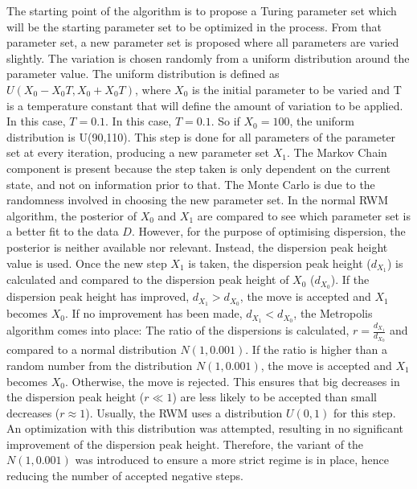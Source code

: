 The starting point of the algorithm is to propose a Turing parameter set which will be the starting parameter set to be optimized in the process.
From that parameter set, a new parameter set is proposed where all parameters are varied slightly.
The variation is chosen randomly from a uniform distribution around the parameter value.
The uniform distribution is defined as $U(X_{0} - X_{0}T, X_{0} + X_{0}T)$, where $X_{0}$ is the initial parameter to be varied and T is a temperature constant that will define the amount of variation to be applied.
In this case, $T=0.1$.
In this case, $T=0.1$.
So if $X_{0}=100$, the uniform distribution is U(90,110).
This step is done for all parameters of the parameter set at every iteration, producing a new parameter set $X_{1}$.
The Markov Chain component is present because the step taken is only dependent on the current state, and not on information prior to that.
The Monte Carlo is due to the randomness involved in choosing the new parameter set.
In the normal RWM algorithm, the posterior of $X_{0}$ and $X_{1}$ are compared to see which parameter set is a better fit to the data $D$.
However, for the purpose of optimising dispersion, the posterior is neither available nor relevant.
Instead, the dispersion peak height value is used.
Once the new step $X_{1}$ is taken, the dispersion peak height ($d_{X_{1}}$) is calculated and compared to the dispersion peak height of $X_{0}$ ($d_{X_{0}}$). If the dispersion peak height has improved, $d_{X_{1}} > d_{X_{0}}$, the move is accepted and $X_{1}$ becomes $X_{0}$.
If no improvement has been made, $d_{X_{1}} < d_{X_{0}}$, the Metropolis algorithm comes into place: The ratio of the dispersions is calculated, $r = \frac{d_{X_{1}}}{d_{X_{0}}}$ and compared to a normal distribution $N(1,0.001)$.
If the ratio is higher than a random number from the distribution $N(1,0.001)$, the move is accepted and $X_{1}$ becomes $X_{0}$.
Otherwise, the move is rejected.
This ensures that big decreases in the dispersion peak height ($r \ll 1$) are less likely to be accepted than small decreases ($r \approx 1$).
Usually, the RWM uses a distribution $U(0,1)$ for this step.
An optimization with this distribution was attempted, resulting in no significant improvement of the dispersion peak height.
Therefore, the variant of the $N(1,0.001) $ was introduced to ensure a more strict regime is in place, hence reducing the number of accepted negative steps.



